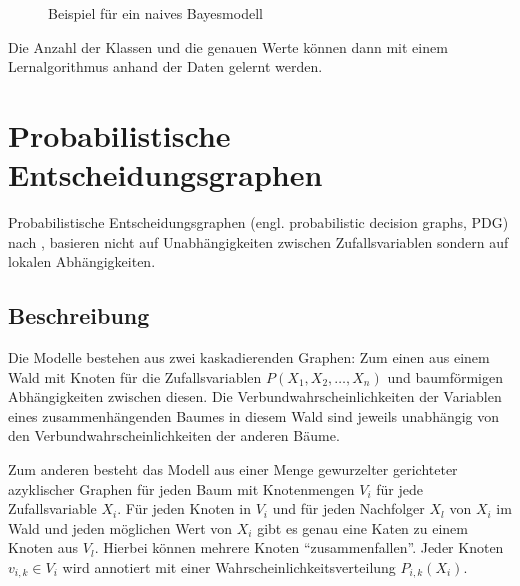 \documentclass{llncs}
\begin{document}
\begin{figure}[htb]
\caption{\label{fig:nbgraph}Beispiel für ein naives Bayesmodell}
\centering
{}
\end{figure}

Die Anzahl der Klassen und die genauen Werte können dann mit einem Lernalgorithmus anhand der Daten gelernt werden. 

\section{Probabilistische Entscheidungsgraphen}

Probabilistische Entscheidungsgraphen (engl. probabilistic decision graphs, PDG) nach \cite{bozga1999representation}, \cite{jaeger2004probabilistic} basieren nicht auf Unabhängigkeiten zwischen Zufallsvariablen sondern auf lokalen Abhängigkeiten. 

\subsection{Beschreibung}

Die Modelle bestehen aus zwei kaskadierenden Graphen: Zum einen aus einem Wald mit Knoten für die Zufallsvariablen $P(X_1,X_2,\dots,X_n)$ und baumförmigen Abhängigkeiten zwischen diesen. Die Verbundwahrscheinlichkeiten der Variablen eines zusammenhängenden Baumes in diesem Wald sind jeweils unabhängig von den Verbundwahrscheinlichkeiten der anderen Bäume. 

Zum anderen besteht das Modell aus einer Menge gewurzelter gerichteter azyklischer Graphen für jeden Baum mit Knotenmengen $V_i$ für jede Zufallsvariable $X_i$. Für jeden Knoten in $V_i$  und für jeden Nachfolger $X_l$ von $X_i$ im Wald und jeden möglichen Wert von $X_i$ gibt es genau eine Katen zu einem Knoten aus $V_l$. Hierbei können mehrere Knoten "`zusammenfallen"'. Jeder Knoten $v_{i,k} \in V_i$ wird annotiert mit einer Wahrscheinlichkeitsverteilung $P_{i,k}(X_i)$. 
\end{document}
